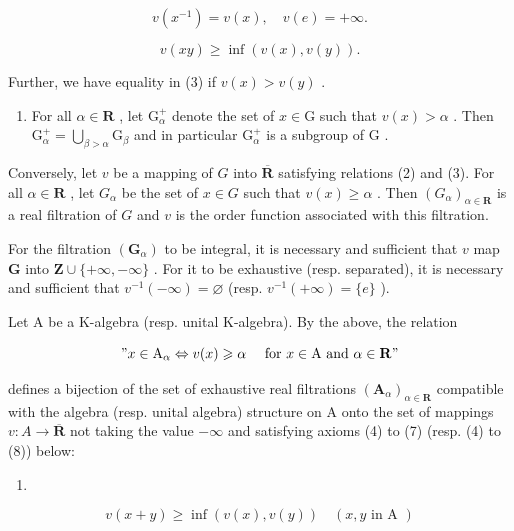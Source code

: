 \[
v (x ^ {- 1}) = v (x), \quad v (e) = + \infty .\tag{2}
\]

\[
v (x y) \geqslant \inf (v (x), v (y)).\tag{3}
\]

Further, we have equality in (3) if \(v(x) > v(y)\) .

\begin{enumerate}
\def\labelenumi{(\alph{enumi})}
\setcounter{enumi}{2}
\tightlist
\item
  For all \(\alpha \in \mathbf{R}\) , let \(\mathrm{G}_{\alpha}^{+}\) denote the set of \(x \in \mathrm{G}\) such that \(v(x) > \alpha\) . Then \(\mathrm{G}_{\alpha}^{+} = \bigcup_{\beta > \alpha} \mathrm{G}_{\beta}\) and in particular \(\mathrm{G}_{\alpha}^{+}\) is a subgroup of \(\mathrm{G}\) .
\end{enumerate}

Conversely, let \(v\) be a mapping of \(G\) into \(\overline{\mathbf{R}}\) satisfying relations (2) and (3). For all \(\alpha \in \mathbf{R}\) , let \(G_{\alpha}\) be the set of \(x \in G\) such that \(v(x) \geqslant \alpha\) . Then \((G_{\alpha})_{\alpha \in \mathbf{R}}\) is a real filtration of \(G\) and \(v\) is the order function associated with this filtration.

For the filtration \((\mathbf{G}_{\alpha})\) to be integral, it is necessary and sufficient that \(v\) map \(\mathbf{G}\) into \(\mathbf{Z} \cup \{+\infty, -\infty\}\) . For it to be exhaustive (resp. separated), it is necessary and sufficient that \(v^{-1}(-\infty) = \varnothing\) (resp. \(v^{-1}(+\infty) = \{e\}\) ).

Let A be a K-algebra (resp. unital K-algebra). By the above, the relation

\[
" x \in \mathrm{A} _ {\alpha} \Leftrightarrow v (x) \geqslant \alpha \quad \text { for } x \in \mathrm{A} \text { and } \alpha \in \mathbf {R}"
\]

defines a bijection of the set of exhaustive real filtrations \((\mathbf{A}_{\alpha})_{\alpha\in\mathbf{R}}\) compatible with the algebra (resp. unital algebra) structure on A onto the set of mappings \(v: A \to \overline{\mathbf{R}}\) not taking the value \(-\infty\) and satisfying axioms (4) to (7) (resp. (4) to (8)) below:

\begin{enumerate}
\def\labelenumi{(\arabic{enumi})}
\setcounter{enumi}{3}
\tightlist
\item
\end{enumerate}

\[
v (x + y) \geqslant \inf (v (x), v (y)) \quad (x, y \text {   in   A })\tag{5}
\]

